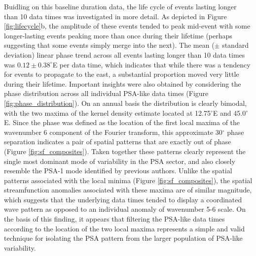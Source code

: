 Buidling on this baseline duration data, the life cycle of events lasting longer than 10 data times was investigated in more detail. As depicted in Figure \ref{fig:lifecycle}b, the amplitude of these events tended to peak mid-event with some longer-lasting events peaking more than once during their lifetime (perhaps suggesting that some events simply merge into the next). The mean ($\pm$ standard deviation) linear phase trend across all events lasting longer than 10 data times was $0.12 \pm 0.38^{\circ}$E per data time, which indicates that while there was a tendency for events to propagate to the east, a substantial proportion moved very little during their lifetime. Important insights were also obtained by considering the phase distribution across all individual PSA-like data times (Figure \ref{fig:phase_distribution}). On an annual basis the distribution is clearly bimodal, with the two maxima of the kernel density estimate located at 12.75$^{\circ}$E and 45.0$^{\circ}$E. Since the phase was defined as the location of the first local maxima of the wavenumber 6 component of the Fourier transform, this approximate 30$^{\circ}$ phase separation indicates a pair of spatial patterns that are exactly out of phase (Figure \ref{fig:sf_composites}). Taken together these patterns clearly represent the single most dominant mode of variability in the PSA sector, and also closely resemble the PSA-1 mode identified by previous authors. Unlike the spatial patterns associated with the local minima (Figure \ref{fig:sf_composites}), the spatial streamfunction anomalies associated with these maxima are of similar magnitude, which suggests that the underlying data times tended to display a coordinated wave pattern as opposed to an individual anomaly of wavenumber 5-6 scale. On the basis of this finding, it appears that filtering the PSA-like data times according to the location of the two local maxima represents a simple and valid technique for isolating the PSA pattern from the larger population of PSA-like variability. 


